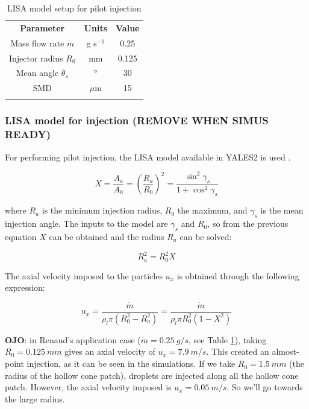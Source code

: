

\begin{table}[!h]
\centering
\caption{LISA model setup for pilot injection}
\begin{tabular}{ccc}
\thickhline
\textbf{Parameter} & \textbf{Units} &  \textbf{Value} \\
\thickhline
Mass flow rate $\dot{m}$ & g s$^{-1}$ & 0.25 \\
Injector radius $R_0$ & mm & 0.125 \\
Mean angle $\overline{\theta}_s$ & $\degree$ & 30  \\
SMD & $\mu$m & 15 \\
\thickhline
\end{tabular}
\label{tab:LISA_model_parameters}
\end{table}

\subsubsection*{LISA model for injection (REMOVE WHEN SIMUS READY)}

For performing pilot injection, the LISA model available in YALES2 is used . 

\begin{equation}
X = \frac{A_a}{A_0} = \left( \frac{R_a}{R_0} \right)^2 = \frac{\sin^2 \gamma_s}{1 + \cos^2 \gamma_s}
\end{equation}

where $R_a$ is the minimum injection radius, $R_0$ the maximum, and $\gamma_s$ is the mean injection angle. The inputs to the model are $\gamma_s$ and $R_0$, so from the previous equation $X$ can be obtained and the radius $R_a$ can be solved:

\begin{equation}
R_a^2 = R_0^2 X
\end{equation}

The axial velocity imposed to the particles $u_x$ is obtained through the following expression:

\begin{equation}
u_x = \frac{\dot{m}}{\rho_l \pi \left( R_0^2 - R_a^2 \right)} = \frac{\dot{m}}{\rho_l \pi R_0^2 \left( 1 - X^2 \right)} 
\end{equation}

\textbf{OJO}: in Renaud's application case ($\dot{m} = 0.25 ~ g/s$, see Table \ref{tab:LISA_model_parameters}), taking $R_0 = 0.125 ~mm$ gives an axial velocity of $u_x = 7.9 ~ m/s$. This created an almost-point injection, as it can be seen in the simulations. If we take $R_0 = 1.5 ~mm$ (the radius of the hollow cone patch), droplets are injected along all the hollow cone patch. However, the axial velocity imposed is $u_x = 0.05 ~m/s$. So we'll go towards the large radius.

